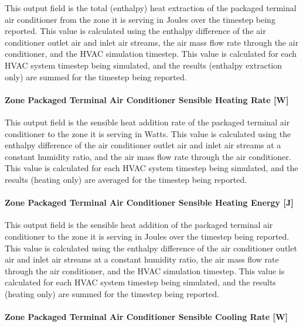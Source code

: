 This output field is the total (enthalpy) heat extraction of the packaged terminal air conditioner from the zone it is serving in Joules over the timestep being reported. This value is calculated using the enthalpy difference of the air conditioner outlet air and inlet air streams, the air mass flow rate through the air conditioner, and the HVAC simulation timestep. This value is calculated for each HVAC system timestep being simulated, and the results (enthalpy extraction only) are summed for the timestep being reported.

\paragraph{Zone Packaged Terminal Air Conditioner Sensible Heating Rate {[}W{]}}\label{zone-packaged-terminal-air-conditioner-sensible-heating-rate-w}

This output field is the sensible heat addition rate of the packaged terminal air conditioner to the zone it is serving in Watts. This value is calculated using the enthalpy difference of the air conditioner outlet air and inlet air streams at a constant humidity ratio, and the air mass flow rate through the air conditioner. This value is calculated for each HVAC system timestep being simulated, and the results (heating only) are averaged for the timestep being reported.

\paragraph{Zone Packaged Terminal Air Conditioner Sensible Heating Energy {[}J{]}}\label{zone-packaged-terminal-air-conditioner-sensible-heating-energy-j}

This output field is the sensible heat addition of the packaged terminal air conditioner to the zone it is serving in Joules over the timestep being reported. This value is calculated using the enthalpy difference of the air conditioner outlet air and inlet air streams at a constant humidity ratio, the air mass flow rate through the air conditioner, and the HVAC simulation timestep. This value is calculated for each HVAC system timestep being simulated, and the results (heating only) are summed for the timestep being reported.

\paragraph{Zone Packaged Terminal Air Conditioner Sensible Cooling Rate {[}W{]}}\label{zone-packaged-terminal-air-conditioner-sensible-cooling-rate-w}


